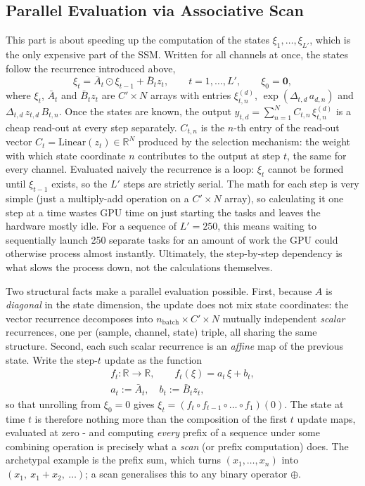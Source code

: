 \documentclass[10pt,a4paper,twocolumn]{article}
\newcommand{\R}{\mathbb{R}}
\begin{document}
	\subsection*{Parallel Evaluation via Associative Scan}
	\label{app:scan}
    	    This part is about speeding up the computation of the states $\xi_1, \dots, \xi_{L'}$, which is the only expensive part of the SSM. Written for all channels at once, the states follow the recurrence introduced above,
	    $$\xi_t = \bar{A}_t \odot \xi_{t-1} + \bar{B}_t z_t, \qquad t = 1,\dots,L', \qquad \xi_0 = \mathbf{0},$$
	    where $\xi_t$, $\bar{A}_t$ and $\bar{B}_t z_t$ are $C' \times N$ arrays with entries $\xi^{(d)}_{t,n}$, $\exp(\Delta_{t,d}\,a_{d,n})$ and $\Delta_{t,d}\, z_{t,d}\, B_{t,n}$. Once the states are known, the output $y_{t,d} = \sum_{n=1}^{N} C_{t,n}\,\xi^{(d)}_{t,n}$ is a cheap read-out at every step separately. $C_{t,n}$ is the $n$-th entry of the read-out vector $C_t = \text{Linear}(z_t) \in \R^N$ produced by the selection mechanism: the weight with which state coordinate $n$ contributes to the output at step $t$, the same for every channel.
	    Evaluated naively the recurrence is a loop: $\xi_t$ cannot be formed until $\xi_{t-1}$ exists, so the $L'$ steps are strictly serial. The math for each step is very simple (just a multiply-add operation on a $C' \times N$ array), so calculating it one step at a time wastes GPU time on just starting the tasks and leaves the hardware mostly idle. For a sequence of $L' = 250$, this means waiting to sequentially launch 250 separate tasks for an amount of work the GPU could otherwise process almost instantly. Ultimately, the step-by-step dependency is what slows the process down, not the calculations themselves.
	
	Two structural facts make a parallel evaluation possible. First, because $A$ is \emph{diagonal} in the state dimension, the update does not mix state coordinates: the vector recurrence decomposes into $n_{\text{batch}} \times C' \times N$ mutually independent \emph{scalar} recurrences, one per (sample, channel, state) triple, all sharing the same structure. Second, each such scalar recurrence is an \emph{affine} map of the previous state. Write the step-$t$ update as the function
	$$\begin{gathered}f_t : \R \to \R, \qquad f_t(\xi) = a_t\,\xi + b_t, \\ a_t := \bar{A}_t,\quad b_t := \bar{B}_t z_t,\end{gathered}$$
	so that unrolling from $\xi_0 = 0$ gives $\xi_t = (f_t \circ f_{t-1} \circ \dots \circ f_1)(0)$. The state at time $t$ is therefore nothing more than the composition of the first $t$ update maps, evaluated at zero - and computing \emph{every} prefix of a sequence under some combining operation is precisely what a \emph{scan} (or prefix computation) does. The archetypal example is the prefix sum, which turns $(x_1, \dots, x_n)$ into $(x_1,\ x_1 + x_2,\ \dots)$; a scan generalises this to any binary operator $\oplus$.
		
\end{document}
